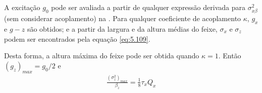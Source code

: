A excitação $g_0$ pode ser avaliada a partir de qualquer expressão derivada para $\sigma_{x\beta}^2$ (sem considerar acoplamento) na . Para qualquer coeficiente de acoplamento $\kappa$, $g_x$ e $g-z$ são obtidos; e a partir da largura e da altura médias do feixe, $\sigma_x$ e $\sigma_z$ podem ser encontrados pela equação \eqref{eq:5.109}.

Desta forma, a altura máxima do feixe pode ser obtida quando $\kappa=1$. Então $(g_z)_{max} = g_0/2$ e
\begin{align}
	\frac{(\sigma_z^2)_{max}}{\beta_z} = \frac{1}{8} \tau_x Q_x
\end{align}
